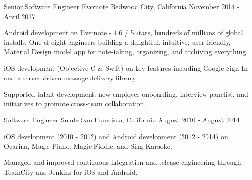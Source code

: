\begin{cventries}
  \cventry
    {Senior Software Engineer} %
    {Evernote} %
    {Redwood City, California} %
    {November 2014 - April 2017} %
    {
	\begin{cvitems} %
      	\item {Android development on Evernote - 4.6 / 5 stars, hundreds of millions of global installs. One of eight engineers building a delightful, intuitive, user-friendly, Material Design model app for note-taking, organizing, and archiving everything.}        
	\item {iOS development (Objective-C \& Swift) on key features including Google Sign-In and a server-driven message delivery library.}
	\item {Supported talent development: new employee onboarding, interview panelist, and initiatives to promote cross-team collaboration.}
	\end{cvitems}
    }
    
  \cventry
    {Software Engineer} %
    {Smule} %
    {San Francisco, California} %
    {August 2010 - August 2014} %
    {
      \begin{cvitems} %
       \item {iOS development (2010 - 2012) and Android development (2012 - 2014) on Ocarina, Magic Piano, Magic Fiddle, and Sing Karaoke.}
        \item {Managed and improved continuous integration and release engineering through TeamCity and Jenkins for iOS and Android.}
      \end{cvitems}
    }
    

\end{cventries}
